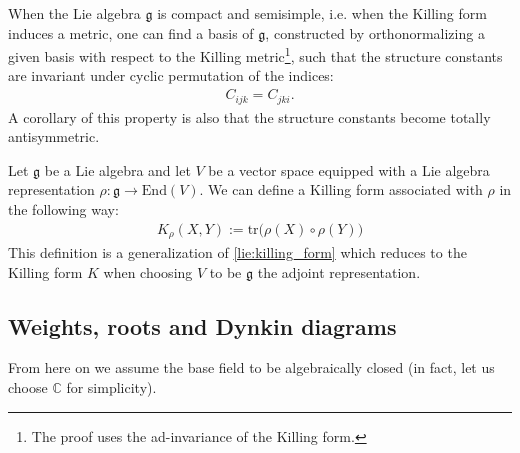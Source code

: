    \begin{property}
        When the Lie algebra $\mathfrak{g}$ is compact and semisimple, i.e. when the Killing form induces a metric, one can find a basis of $\mathfrak{g}$, constructed by orthonormalizing a given basis with respect to the Killing metric\footnote{The proof uses the ad-invariance of the Killing form.}, such that the structure constants are invariant under cyclic permutation of the indices:
        \begin{gather}
            C_{ijk} = C_{jki}.
        \end{gather}
        A corollary of this property is also that the structure constants become totally antisymmetric.
    \end{property}

    \begin{construct}
        Let $\mathfrak{g}$ be a Lie algebra and let $V$ be a vector space equipped with a Lie algebra representation $\rho:\mathfrak{g}\rightarrow\text{End}(V)$. We can define a Killing form associated with $\rho$ in the following way:
        \begin{gather}
            \label{lie:rho_killing_form}
            K_\rho(X,Y) := \text{tr}\big(\rho(X)\circ\rho(Y)\big)
        \end{gather}
        This definition is a generalization of \eqref{lie:killing_form} which reduces to the Killing form $K$ when choosing $V$ to be $\mathfrak{g}$ the adjoint representation.
    \end{construct}

\subsection{Weights, roots and Dynkin diagrams}

    From here on we assume the base field to be algebraically closed (in fact, let us choose $\mathbb{C}$ for simplicity).


